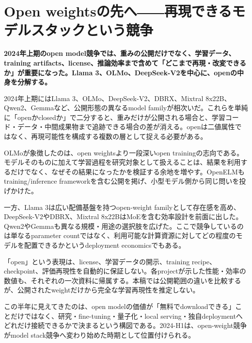 \section{Open weightsの先へ――再現できるモデルスタックという競争}
\label{pkg:open-ecosystem}
\noindent\textbf{2024年上期のopen model競争では、重みの公開だけでなく、学習データ、training artifacts、license、推論効率まで含めて「どこまで再現・改変できるか」が重要になった。Llama 3、OLMo、DeepSeek-V2を中心に、openの中身を分解する。}\autocite{src-3d2fa83e273d,src-d9d69089eb6a,src-f9616f30e8f5}

2024年上期にはLlama 3、OLMo、DeepSeek-V2、DBRX、Mixtral 8x22B、Qwen2、Gemmaなど、公開形態の異なるmodel familyが相次いだ。これらを単純に「openかclosedか」で二分すると、重みだけが公開される場合と、学習コード・データ・中間成果物まで追跡できる場合の差が消える。openは二値属性ではなく、再現可能性を構成する複数の層として捉える必要がある。\autocite{src-0395647db4a8,src-05f98c47f3e8,src-3d2fa83e273d,src-461ae12066d1,src-d9d69089eb6a,src-f9616f30e8f5,src-ff36b1c2ef30}


OLMoが象徴したのは、open weightsより一段深いopen trainingの志向である。モデルそのものに加えて学習過程を研究対象として扱えることは、結果を利用するだけでなく、なぜその結果になったかを検証する余地を増やす。OpenELMもtraining/inference frameworkを含む公開を掲げ、小型モデル側から同じ問いを投げかけた。\autocite{src-3d2fa83e273d,src-4d404eabda6e}


一方、Llama 3は広い配備基盤を持つopen-weight familyとして存在感を高め、DeepSeek-V2やDBRX、Mixtral 8x22BはMoEを含む効率設計を前面に出した。Qwen2やGemmaも異なる規模・用途の選択肢を広げた。ここで競争しているのは単なるparameter countではなく、利用可能な計算資源に対してどの程度のモデルを配置できるかというdeployment economicsでもある。\autocite{src-0395647db4a8,src-05f98c47f3e8,src-461ae12066d1,src-d9d69089eb6a,src-f9616f30e8f5,src-ff36b1c2ef30}


\begin{claimboundary}
「open」という表現は、license、学習データの開示、training recipe、checkpoint、評価再現性を自動的に保証しない。各projectが示した性能・効率の数値も、それぞれの一次資料に帰属する。本稿では公開範囲の違いを比較するが、公開されたweightだけから完全な学習再現性を推定しない。\autocite{src-37f17fc6592f,src-3d2fa83e273d,src-8ccec4bc715c,src-d9d69089eb6a,src-f9616f30e8f5}
\end{claimboundary}

この半年に見えてきたのは、open modelの価値が「無料でdownloadできる」ことだけではなく、研究・fine-tuning・量子化・local serving・独自deploymentへどれだけ接続できるかで決まるという構図である。2024-H1は、open-weight競争がmodel stack競争へ変わり始めた時期として位置付けられる。\autocite{src-3d2fa83e273d,src-4d404eabda6e,src-d9d69089eb6a,src-f9616f30e8f5}
